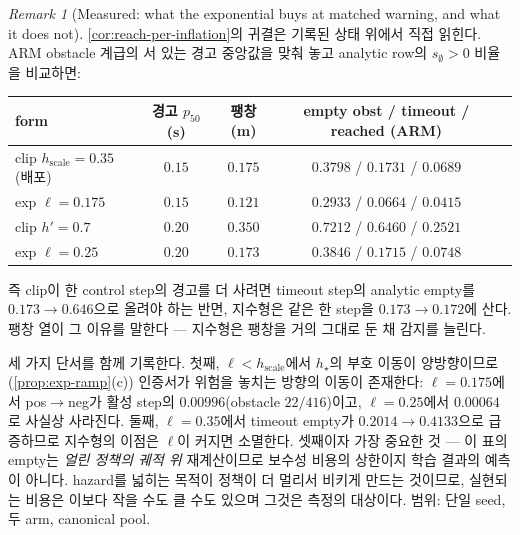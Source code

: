 \documentclass[11pt]{article}
\theoremstyle{plain}
\theoremstyle{definition}
\theoremstyle{remark}
\newtheorem{remark}[theorem]{Remark}
\begin{document}
\begin{remark}[Measured: what the exponential buys at matched warning, and what it does not]\label{rem:exp-matched}
\cref{cor:reach-per-inflation}의 귀결은 기록된 상태 위에서 직접 읽힌다. ARM obstacle 계급의
서 있는 경고 중앙값을 맞춰 놓고 analytic row의 $s_\emptyset>0$ 비율을 비교하면:

\begin{center}
\begin{tabular}{lcccc}
\toprule
form & 경고 $p_{50}$ (s) & 팽창 (m) & empty obst / timeout / reached (ARM) \\
\midrule
clip $h_{\mathrm{scale}}=0.35$ (배포) & $0.15$ & $0.175$ & $0.3798$ / $0.1731$ / $0.0689$ \\
exp $\ell=0.175$                      & $0.15$ & $0.121$ & $0.2933$ / $0.0664$ / $0.0415$ \\
clip $h'=0.7$                         & $0.20$ & $0.350$ & $0.7212$ / $0.6460$ / $0.2521$ \\
exp $\ell=0.25$                       & $0.20$ & $0.173$ & $0.3846$ / $0.1715$ / $0.0748$ \\
\bottomrule
\end{tabular}
\end{center}

즉 clip이 한 control step의 경고를 더 사려면 timeout step의 analytic empty를 $0.173\to0.646$으로
올려야 하는 반면, 지수형은 같은 한 step을 $0.173\to0.172$에 산다. 팽창 열이 그 이유를 말한다 ---
지수형은 팽창을 거의 그대로 둔 채 감지를 늘린다.

세 가지 단서를 함께 기록한다. 첫째, $\ell<h_{\mathrm{scale}}$에서 $h_\star$의 부호 이동이
양방향이므로(\cref{prop:exp-ramp}(c)) 인증서가 위험을 놓치는 방향의 이동이 존재한다:
$\ell=0.175$에서 pos$\to$neg가 활성 step의 $0.00996$(obstacle $22/416$)이고, $\ell=0.25$에서
$0.00064$로 사실상 사라진다. 둘째, $\ell=0.35$에서 timeout empty가 $0.2014\to0.4133$으로 급증하므로
지수형의 이점은 $\ell$이 커지면 소멸한다. 셋째이자 가장 중요한 것 --- 이 표의 empty는 \emph{얼린
정책의 궤적 위} 재계산이므로 보수성 비용의 상한이지 학습 결과의 예측이 아니다. hazard를 넓히는
목적이 정책이 더 멀리서 비키게 만드는 것이므로, 실현되는 비용은 이보다 작을 수도 클 수도 있으며
그것은 측정의 대상이다. 범위: 단일 seed, 두 arm, canonical pool.
\end{remark}
\end{document}
